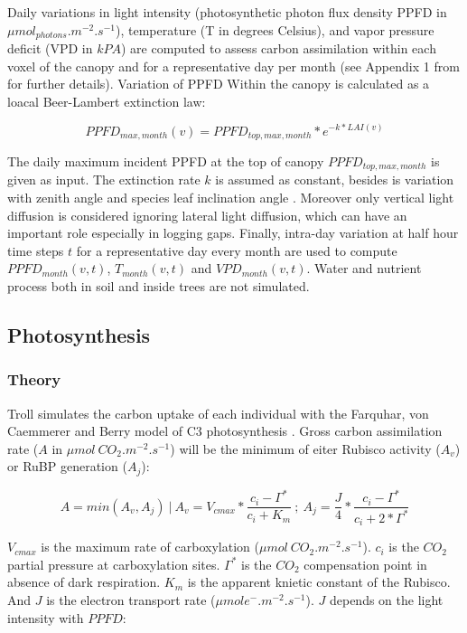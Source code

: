 \documentclass[]{article}
\theoremstyle{definition}
\theoremstyle{definition}
\theoremstyle{remark}
\begin{document}
Daily variations in light intensity (photosynthetic photon flux density
PPFD in \(\mu mol_{photons}.m^{-2}.s^{-1}\)), temperature (T in degrees
Celsius), and vapor pressure deficit (VPD in \(kPA\)) are computed to
assess carbon assimilation within each voxel of the canopy and for a
representative day per month (see Appendix 1 from \citet{Li} for further
details). Variation of PPFD Within the canopy is calculated as a loacal
Beer-Lambert extinction law:

\begin{equation}
  PPFD_{max,month}(v) = PPFD_{top,max,month}*e^{-k*LAI(v)}
  \label{eq:PPFD}
\end{equation}

The daily maximum incident PPFD at the top of canopy
\(PPFD_{top,max,month}\) is given as input. The extinction rate \(k\) is
assumed as constant, besides is variation with zenith angle and species
leaf inclination angle \citep{Meir2000}. Moreover only vertical light
diffusion is considered ignoring lateral light diffusion, which can have
an important role especially in logging gaps. Finally, intra-day
variation at half hour time steps \(t\) for a representative day every
month are used to compute \(PPFD_{month}(v,t)\), \(T_{month}(v,t)\) and
\(VPD_{month}(v,t)\). Water and nutrient process both in soil and inside
trees are not simulated.

\subsection{Photosynthesis}\label{photosynthesis}

\subsubsection{Theory}\label{theory}

Troll simulates the carbon uptake of each individual with the Farquhar,
von Caemmerer and Berry model of C3 photosynthesis \citep{Farquhar1980}.
Gross carbon assimilation rate (\(A\) in
\(\mu mol~CO_2. m^{-2}.s^{-1}\)) will be the minimum of eiter Rubisco
activity (\(A_v\)) or RuBP generation (\(A_j\)):

\begin{equation}
  A=min(A_v, A_j)~|~A_v=V_{cmax}*\frac{c_i-\Gamma^*}{c_i+K_m}~;~A_j=\frac{J}{4}*\frac{c_i-\Gamma^*}{c_i+2*\Gamma^*}
  \label{eq:A}
\end{equation}

\(V_{cmax}\) is the maximum rate of carboxylation
(\(\mu mol~CO_2.m^{-2}.s^{-1}\)). \(c_i\) is the \(CO_2\) partial
pressure at carboxylation sites. \(\Gamma^*\) is the \(CO_2\)
compensation point in absence of dark respiration. \(K_m\) is the
apparent knietic constant of the Rubisco. And \(J\) is the electron
transport rate (\(\mu mol e^-.m^{-2}.s^{-1}\)). \(J\) depends on the
light intensity with \(PPFD\):
\end{document}
